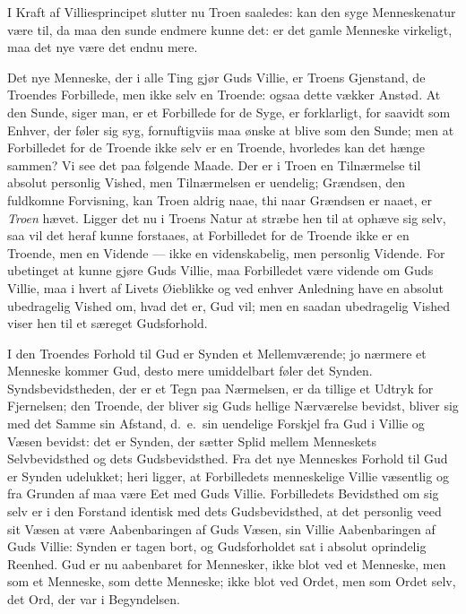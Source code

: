 \documentclass[12pt]{book}
\begin{document}
I Kraft af Villiesprincipet slutter nu Troen saaledes: kan den syge
Menneskenatur være til, da maa den sunde endmere kunne det: er det
gamle Menneske virkeligt, maa det nye være det endnu mere.

Det nye Menneske, der i alle Ting gjør Guds Villie, er Troens
Gjenstand, de Troendes Forbillede, men ikke selv en Troende: ogsaa
dette vækker Anstød. At den Sunde, siger man, er et Forbillede for
de Syge, er forklarligt, for saavidt som Enhver, der føler sig syg,
fornuftigviis maa ønske at blive som den Sunde; men at Forbilledet
for de Troende ikke selv er en Troende, hvorledes kan det hænge
sammen? Vi see det paa følgende Maade. Der er i Troen en
Tilnærmelse til absolut personlig Vished, men Tilnærmelsen er
uendelig; Grændsen, den fuldkomne Forvisning, kan Troen aldrig naae,
thi naar Grændsen er naaet, er \emph{Troen} hævet. Ligger det nu i
Troens Natur at stræbe hen til at ophæve sig selv, saa vil det heraf
kunne forstaaes, at Forbilledet for de Troende ikke er en Troende,
men en Vidende --- ikke en videnskabelig, men personlig Vidende. For
ubetinget at kunne gjøre Guds Villie, maa Forbilledet være vidende
om Guds Villie, maa i hvert af Livets Øieblikke og ved enhver
Anledning have en absolut ubedragelig Vished om, hvad det er, Gud
vil; men en saadan ubedragelig Vished viser hen til et særeget
Gudsforhold.

I den Troendes Forhold til Gud er Synden et Mellemværende; jo
nærmere et Menneske kommer Gud, desto mere umiddelbart føler det
Synden. Syndsbevidstheden, der er et Tegn paa Nærmelsen, er da
tillige et Udtryk for Fjernelsen; den Troende, der bliver sig Guds
hellige Nærværelse bevidst, bliver sig med det Samme sin Afstand,
d.\ e.\ sin uendelige Forskjel fra Gud i Villie og Væsen bevidst:
det er Synden, der sætter Splid mellem
Menneskets Selvbevidsthed og dets Gudsbevidsthed. Fra det nye
Menneskes Forhold til Gud er Synden udelukket; heri ligger, at
Forbilledets menneskelige Villie væsentlig og fra Grunden af maa
være Eet med Guds Villie. Forbilledets Bevidsthed om sig selv er i
den Forstand identisk med dets Gudsbevidsthed, at det personlig veed
sit Væsen at være Aabenbaringen af Guds Væsen, sin Villie
Aabenbaringen af Guds Villie: Synden er tagen bort, og Gudsforholdet
sat i absolut oprindelig Reenhed. Gud er nu aabenbaret for
Mennesker, ikke blot ved et Menneske, men som et Menneske, som dette
Menneske; ikke blot ved Ordet, men som Ordet selv, det Ord, der var
i Begyndelsen.
\end{document}
